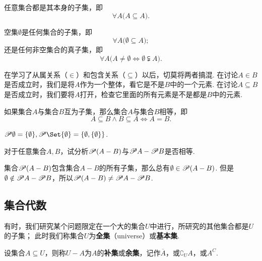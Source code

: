 \begin{theorem}
任意集合都是其本身的子集，即\[
\forall A \bigl( A \subseteq A \bigr).
\]
\end{theorem}

\begin{theorem}
空集\(\emptyset\)是任何集合的子集，即\[
\forall A \bigl( \emptyset \subseteq A \bigr);
\]还是任何非空集合的真子集，即\[
\forall A \bigl( A \neq \emptyset \iff \emptyset \subsetneqq A \bigr).
\]
\end{theorem}

在学习了从属关系（\(\in\)）和包含关系（\(\subseteq\)）以后，切莫将两者搞混.
在讨论\(A \in B\)是否成立时，我们是将\(A\)作为一个整体，看它是不是\(B\)中的一个元素.
在讨论\(A \subseteq B\)是否成立时，我们要将\(A\)打开，检查它里面的所有元素是不是都是\(B\)中的元素.

\begin{theorem}
如果集合\(A\)与集合\(B\)互为子集，那么集合\(A\)与集合\(B\)相等，即\[
A \subseteq B \land B \subseteq A
\iff
A = B.
\]
\end{theorem}

\begin{example}
\(\Powerset \emptyset = \{ \emptyset \},%
\Powerset \Set{ \emptyset } = \{ \emptyset, \{ \emptyset \} \}\).
\end{example}

\begin{example}
对于任意集合\(A,B\)，试分析\(\mathscr{P}(A-B)\)与\(\mathscr{P} A - \mathscr{P} B\)是否相等.
\begin{solution}
集合\(\mathscr{P}(A-B)\)包含集合\(A-B\)的所有子集，那么总有\(\emptyset\in\mathscr{P}(A-B)\).
但是\(\emptyset\notin\mathscr{P} A - \mathscr{P} B\)，所以\(\mathscr{P}(A-B) \neq \mathscr{P} A - \mathscr{P} B\).
\end{solution}
\end{example}

\subsection{集合代数}
\begin{definition}[全集、补集]
有时，我们研究某个问题限定在一个大的集合\(U\)中进行，所研究的其他集合都是\(U\)的子集；
此时我们称集合\(U\)为\textbf{全集}（universe）或\textbf{基本集}.

设集合\(A \subseteq U\)，则称\(U-A\)为\(A\)的\textbf{补集}或\textbf{余集}，记作\(\overline{A}\)，或\(\complement_U A\)，或\(A^C\).
\end{definition}

